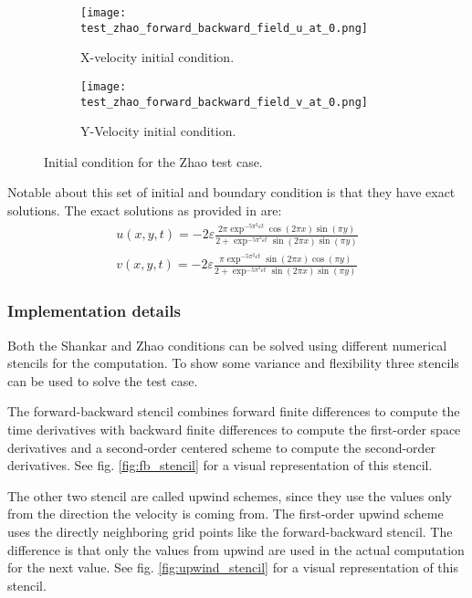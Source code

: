 \begin{figure}
\centering
\begin{subfigure}{.5\textwidth}
  \centering
  \texttt{[image: test\_zhao\_forward\_backward\_field\_u\_at\_0.png]}
  \caption{X-velocity initial condition.}
  \label{fig:zhao_ic1}
\end{subfigure}%
\begin{subfigure}{.5\textwidth}
  \centering
  \texttt{[image: test\_zhao\_forward\_backward\_field\_v\_at\_0.png]}
  \caption{Y-Velocity initial condition.}
  \label{fig:zhao_ic2}
\end{subfigure}
\caption{Initial condition for the Zhao test case.}
\label{fig:zhao_ic}
\end{figure}

Notable about this set of initial and boundary condition is that they have exact solutions.
The exact solutions as provided in \citet{zhao2011new} are:
\\
\begin{equation}
\begin{split}
u\left(x,y,t\right) = -2\varepsilon \frac{2 \pi \exp^{-5 \pi^2 \varepsilon t} \cos\left(2 \pi x\right) \sin\left(\pi y\right)}{2 + \exp^{-5 \pi^2 \varepsilon t}\sin\left(2 \pi x\right) \sin\left(\pi y\right)}
\\
v\left(x,y,t\right) = -2\varepsilon \frac{\pi \exp^{-5 \pi^2 \varepsilon t} \sin\left(2 \pi x\right) \cos\left(\pi y\right)}{2 + \exp^{-5 \pi^2 \varepsilon t}\sin\left(2 \pi x\right) \sin\left(\pi y\right)}
\end{split}
\end{equation}

\subsubsection{Implementation details}
Both the Shankar and Zhao conditions can be solved using different numerical stencils for the computation.
To show some variance and flexibility three stencils can be used to solve the test case.

The forward-backward stencil combines forward finite differences to compute the time derivatives with backward finite differences to compute the first-order space derivatives and a second-order centered scheme to compute the second-order derivatives.
See fig. \ref{fig:fb_stencil} for a visual representation of this stencil.

The other two stencil are called upwind schemes, since they use the values only from the direction the velocity is coming from.
The first-order upwind scheme uses the directly neighboring grid points like the forward-backward stencil.
The difference is that only the values from upwind are used in the actual computation for the next value.
See fig. \ref{fig:upwind_stencil} for a visual representation of this stencil.

